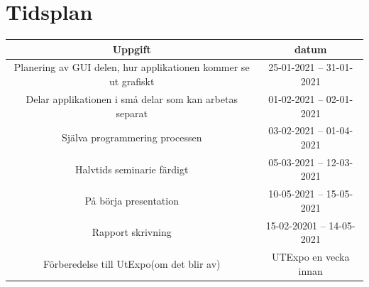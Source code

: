 \documentclass{article}
\begin{document}
\section{Tidsplan} 
\begin{table}[h!]

    \begin{tabular}{|c|c|}
        \hline
        \textbf {Uppgift} & \textbf{datum}  \\
        \hline
        Planering av GUI delen, hur applikationen kommer se ut grafiskt & 25-01-2021 -- 31-01-2021 \\
        \hline
        Delar applikationen i små delar som kan arbetas separat & 01-02-2021 -- 02-01-2021\\
        \hline
        Själva programmering processen & 03-02-2021 -- 01-04-2021\\
        \hline
        Halvtids seminarie färdigt & 05-03-2021 -- 12-03-2021\\
        \hline
        På börja presentation  & 10-05-2021 -- 15-05-2021 \\
        \hline
        Rapport skrivning & 15-02-20201 -- 14-05-2021\\
        \hline
        Förberedelse till UtExpo(om det blir av) & UTExpo en vecka innan \\
        \hline
    \end{tabular}
\end{table}
\newpage
\printbibliography
\end{document}

